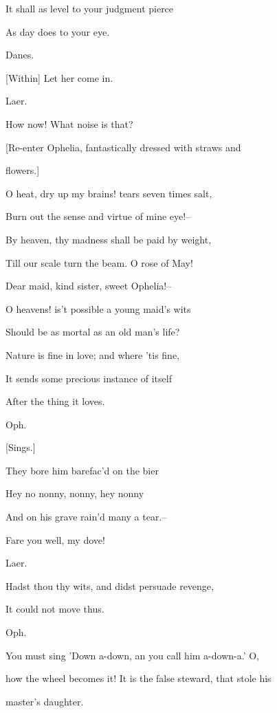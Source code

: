 \documentclass[12pt]{book}
\begin{document}
It shall as level to your judgment pierce

As day does to your eye.



Danes.

[Within] Let her come in.



Laer.

How now! What noise is that?



[Re-enter Ophelia, fantastically dressed with straws and

flowers.]



O heat, dry up my brains! tears seven times salt,

Burn out the sense and virtue of mine eye!--

By heaven, thy madness shall be paid by weight,

Till our scale turn the beam. O rose of May!

Dear maid, kind sister, sweet Ophelia!--

O heavens! is't possible a young maid's wits

Should be as mortal as an old man's life?

Nature is fine in love; and where 'tis fine,

It sends some precious instance of itself

After the thing it loves.



Oph.

[Sings.]

   They bore him barefac'd on the bier

   Hey no nonny, nonny, hey nonny

   And on his grave rain'd many a tear.--



Fare you well, my dove!



Laer.

Hadst thou thy wits, and didst persuade revenge,

It could not move thus.



Oph.

You must sing 'Down a-down, an you call him a-down-a.' O,

how the wheel becomes it! It is the false steward, that stole his

master's daughter.
\end{document}
